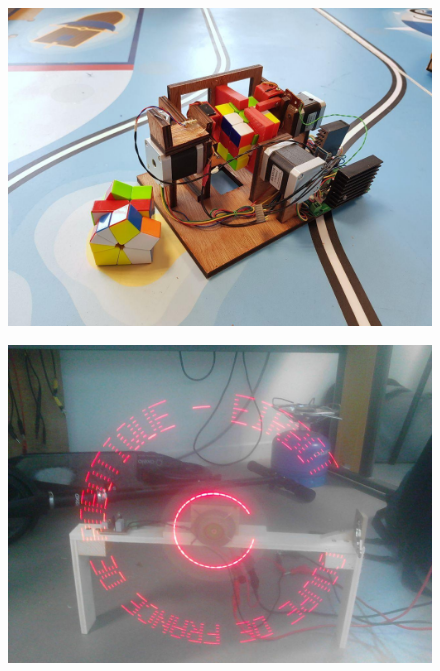 \documentclass[a4paper,10pt]{article}
\begin{document}
\begin{spacing}{1.5}
\begin{multicols}{2}
  \begin{figure}[H]
    \center
    \includegraphics[scale=0.2]{rubix_cube.jpg}
  \end{figure}
  \columnbreak
  \begin{figure}[H]
    \center
    \includegraphics[scale=0.2]{tourne.jpg}
  \end{figure}
\end{multicols}

\newpage
\end{spacing}
\end{document}
